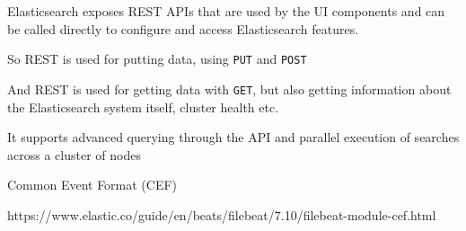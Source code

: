 \documentclass[Screen16to9,17pt]{foils}
\begin{document}


\begin{quote}

\end{quote}

\begin{list2}
  \item
\end{list2}



\begin{quote}

\end{quote}

\begin{list2}
\item Elasticsearch exposes REST APIs that are used by the UI components and can be called directly to configure and access Elasticsearch features.
\item {}
\item So REST is used for putting data, using \verb+PUT+ and \verb+POST+
\item And REST is used for getting data with \verb+GET+, but also getting information about the Elasticsearch system itself, cluster health etc.
\item It supports advanced querying through the API and parallel execution of searches across a cluster of nodes
\end{list2}



\begin{quote}

\end{quote}

\begin{list2}
  \item Common Event Format (CEF)

\end{list2}

https://www.elastic.co/guide/en/beats/filebeat/7.10/filebeat-module-cef.html











\slidenext{}
\end{document}
